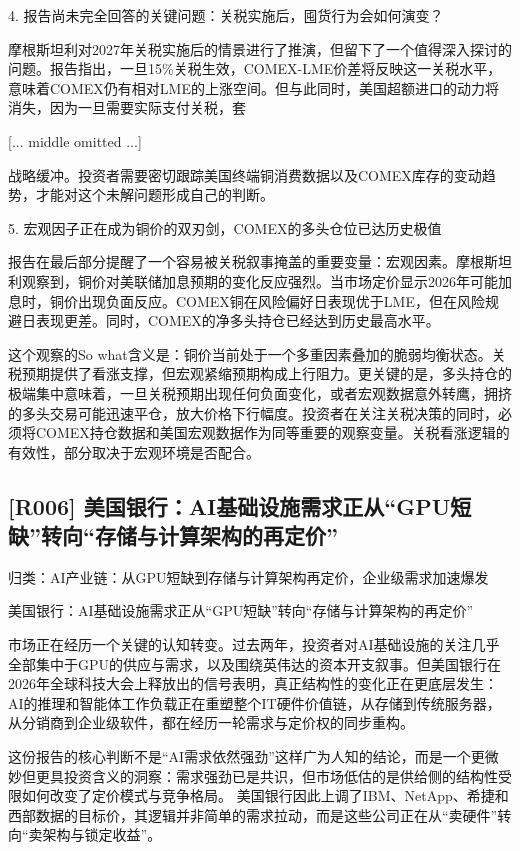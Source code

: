 \documentclass[11pt]{ctexart}
\begin{document}
4. 报告尚未完全回答的关键问题：关税实施后，囤货行为会如何演变？

摩根斯坦利对2027年关税实施后的情景进行了推演，但留下了一个值得深入探讨的问题。报告指出，一旦15\%关税生效，COMEX-LME价差将反映这一关税水平，意味着COMEX仍有相对LME的上涨空间。但与此同时，美国超额进口的动力将消失，因为一旦需要实际支付关税，套

[... middle omitted ...]

战略缓冲。投资者需要密切跟踪美国终端铜消费数据以及COMEX库存的变动趋势，才能对这个未解问题形成自己的判断。

5. 宏观因子正在成为铜价的双刃剑，COMEX的多头仓位已达历史极值

报告在最后部分提醒了一个容易被关税叙事掩盖的重要变量：宏观因素。摩根斯坦利观察到，铜价对美联储加息预期的变化反应强烈。当市场定价显示2026年可能加息时，铜价出现负面反应。COMEX铜在风险偏好日表现优于LME，但在风险规避日表现更差。同时，COMEX的净多头持仓已经达到历史最高水平。

这个观察的So what含义是：铜价当前处于一个多重因素叠加的脆弱均衡状态。关税预期提供了看涨支撑，但宏观紧缩预期构成上行阻力。更关键的是，多头持仓的极端集中意味着，一旦关税预期出现任何负面变化，或者宏观数据意外转鹰，拥挤的多头交易可能迅速平仓，放大价格下行幅度。投资者在关注关税决策的同时，必须将COMEX持仓数据和美国宏观数据作为同等重要的观察变量。关税看涨逻辑的有效性，部分取决于宏观环境是否配合。

\subsection{[R006] 美国银行：AI基础设施需求正从“GPU短缺”转向“存储与计算架构的再定价”}
{\small\color{refgray}归类：AI产业链：从GPU短缺到存储与计算架构再定价，企业级需求加速爆发}

美国银行：AI基础设施需求正从“GPU短缺”转向“存储与计算架构的再定价”

市场正在经历一个关键的认知转变。过去两年，投资者对AI基础设施的关注几乎全部集中于GPU的供应与需求，以及围绕英伟达的资本开支叙事。但美国银行在2026年全球科技大会上释放出的信号表明，真正结构性的变化正在更底层发生：AI的推理和智能体工作负载正在重塑整个IT硬件价值链，从存储到传统服务器，从分销商到企业级软件，都在经历一轮需求与定价权的同步重构。

这份报告的核心判断不是“AI需求依然强劲”这样广为人知的结论，而是一个更微妙但更具投资含义的洞察：需求强劲已是共识，但市场低估的是供给侧的结构性受限如何改变了定价模式与竞争格局。 美国银行因此上调了IBM、NetApp、希捷和西部数据的目标价，其逻辑并非简单的需求拉动，而是这些公司正在从“卖硬件”转向“卖架构与锁定收益”。
\end{document}
